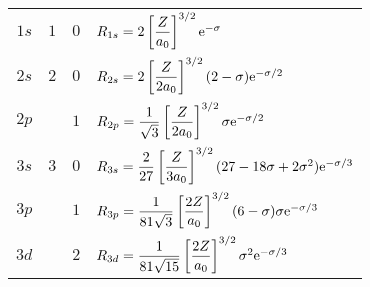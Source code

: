 \documentclass[../main.tex]{subfiles}
\begin{document}
\begin{itemize}
\begin{table}[h!]
\begin{tabular}{cccl}
            $1s$ & $1$ & $0$ & $R_{1s}=2\left[ \dfrac{Z}{a_0} \right]^{3/2}\e[-\sigma]$\rule{0pt}{7mm}\\[3.5mm]
            \rowcolor{grt}
            $2s$ & $2$ & $0$ & $R_{2s}=2\left[ \dfrac{Z}{2a_0} \right]^{3/2}(2-\sigma)\e[-\sigma/2]$\rule{0pt}{7mm}\\[3.5mm]
            $2p$ &     & $1$ & $R_{2p}=\dfrac{1}{\sqrt{3}}\left[ \dfrac{Z}{2a_0} \right]^{3/2}\sigma\e[-\sigma/2]$\rule{0pt}{7mm}\\[3.5mm]
            \rowcolor{grt}
            $3s$ & $3$ & $0$ & $R_{3s}=\dfrac{2}{27}\left[ \dfrac{Z}{3a_0} \right]^{3/2}(27-18\sigma+2\sigma^2)\e[-\sigma/3]$\rule{0pt}{7mm}\\[3.5mm]
            $3p$ &     & $1$ & $R_{3p}=\dfrac{1}{81\sqrt{3}}\left[ \dfrac{2Z}{a_0} \right]^{3/2}(6-\sigma)\sigma\e[-\sigma/3]$\rule{0pt}{7mm}\\[3.5mm]
            \rowcolor{grt}
            $3d$ &     & $2$ & $R_{3d}=\dfrac{1}{81\sqrt{15}}\left[ \dfrac{2Z}{a_0} \right]^{3/2}\sigma^2\e[-\sigma/3]$\rule{0pt}{7mm}\\[3.5mm]
            

\end{tabular}
\end{table}
\end{itemize}
\end{document}
